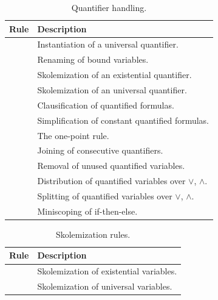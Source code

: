 \begin{xltabular}{\linewidth}{l X}
\caption{Quantifier handling.}
\label{rule-tab:quants}\\
  Rule & Description \\
  \hline
{} & Instantiation of a universal quantifier. \\
 & Renaming of bound variables. \\
 & Skolemization of an existential quantifier. \\
 & Skolemization of an universal quantifier. \\
 & Clausification of quantified formulas. \\
 & Simplification of constant quantified formulas. \\
 & The one-point rule. \\
 & Joining of consecutive quantifiers. \\
 & Removal of unused quantified variables. \\
 & Distribution of quantified variables over $\lor$, $\land$. \\
      & Splitting of quantified variables over $\lor$, $\land$. \\
        & Miniscoping of if-then-else. \\
\end{xltabular}

\begin{xltabular}{\linewidth}{l X}
\caption{Skolemization rules.}
\label{rule-tab:skos}\\
  Rule & Description \\
  \hline
{} & Skolemization of existential variables. \\
 & Skolemization of universal variables. \\
\end{xltabular}

